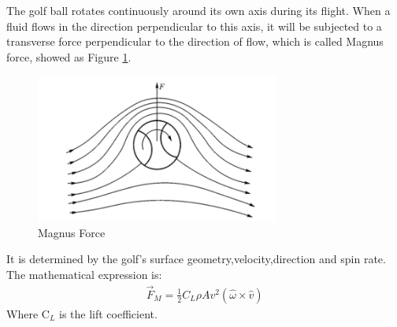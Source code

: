 The golf ball rotates continuously around its own axis during its flight. When a fluid flows in the direction perpendicular to this axis, it will be subjected to a transverse force perpendicular to the direction of flow, which is called Magnus force, showed as Figure \ref{fig:magnus}.
\begin{figure}[H]
    \centering
    \includegraphics[width=8cm]{figure/Magnus.png}
    \caption{Magnus Force}
    \label{fig:magnus}
\end{figure}
It is determined by the golf's surface geometry,velocity,direction and spin rate. The mathematical expression is:
\begin{align}
    \vec{F}_{M}=\frac{1}{2} C_{L} \rho A v^{2}(\hat{\omega} \times \hat{v})
\end{align}
Where C$_L$ is the lift coefficient.

